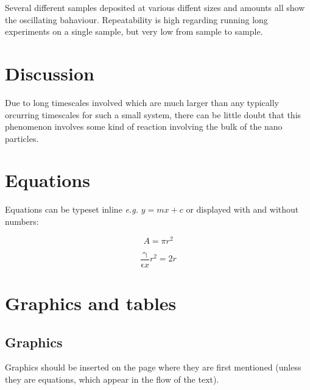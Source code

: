 \documentclass[8.5pt,twoside,twocolumn]{article}
\begin{document}
Several different samples deposited at various diffent sizes and amounts all show the oscillating bahaviour. Repeatability is high regarding running long experiments on a single sample, but very low from sample to sample.

\section{Discussion}
Due to long timescales involved which are much larger than any typically orcurring timescales for such a small system, there can be little doubt that this phenomenon involves some kind of reaction involving the bulk of the nano particles.







\section{Equations}

Equations can be typeset inline \textit{e.g.} $ y = mx + c$ or displayed with and without numbers:

 \[ A = \pi r^2 \]

\begin{equation}
  \frac{\mathrm{\gamma}}{\mathrm{\epsilon}x} r^2 = 2r
\end{equation}

\section{Graphics and tables}
\subsection{Graphics}
Graphics should be inserted on the page where they are first mentioned (unless they are equations, which appear in the flow of the text).
\end{document}
